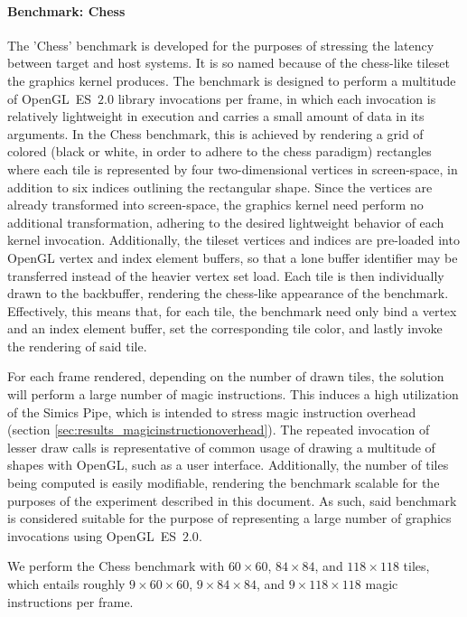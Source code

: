 \paragraph{Benchmark: Chess}
\label{par:experimentalmethodology_benchmarking_benchmarkchess}
The 'Chess' benchmark is developed for the purposes of stressing the latency between target and host systems.
It is so named because of the chess-like tileset the graphics kernel produces.
The benchmark is designed to perform a multitude of OpenGL~ES~$2.0$ library invocations per frame, in which each invocation is relatively lightweight in execution and carries a small amount of data in its arguments.
In the Chess benchmark, this is achieved by rendering a grid of colored (black or white, in order to adhere to the chess paradigm) rectangles where each tile is represented by four two-dimensional vertices in screen-space, in addition to six indices outlining the rectangular shape.
Since the vertices are already transformed into screen-space, the graphics kernel need perform no additional transformation, adhering to the desired lightweight behavior of each kernel invocation.
Additionally, the tileset vertices and indices are pre-loaded into OpenGL vertex and index element buffers, so that a lone buffer identifier may be transferred instead of the heavier vertex set load.
Each tile is then individually drawn to the backbuffer, rendering the chess-like appearance of the benchmark.
Effectively, this means that, for each tile, the benchmark need only bind a vertex and an index element buffer, set the corresponding tile color, and lastly invoke the rendering of said tile.

For each frame rendered, depending on the number of drawn tiles, the solution will perform a large number of magic instructions.
This induces a high utilization of the Simics Pipe, which is intended to stress magic instruction overhead (section \ref{sec:results_magicinstructionoverhead}).
The repeated invocation of lesser draw calls is representative of common usage of drawing a multitude of shapes with OpenGL, such as a user interface. Additionally, the number of tiles being computed is easily modifiable, rendering the benchmark scalable for the purposes of the experiment described in this document. As such, said benchmark is considered suitable for the purpose of representing a large number of graphics invocations using OpenGL~ES~$2.0$.

We perform the Chess benchmark with $60\times60$, $84\times84$, and $118\times118$ tiles, which entails roughly $9\times60\times60$, $9\times84\times84$, and $9\times118\times118$ magic instructions per frame.

